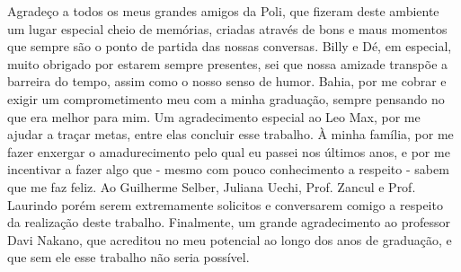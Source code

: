 \begin{agradecimentos}

Agradeço a todos os meus grandes amigos da Poli, que fizeram deste ambiente um lugar especial cheio de memórias, criadas através de bons e maus momentos que sempre são o ponto de partida das nossas conversas. Billy e Dé, em especial, muito obrigado por estarem sempre presentes, sei que nossa amizade transpõe a barreira do tempo, assim como o nosso senso de humor. Bahia, por me cobrar e exigir um comprometimento meu com a minha graduação, sempre pensando no que era melhor para mim. Um agradecimento especial ao Leo Max, por me ajudar a traçar metas, entre elas concluir esse trabalho. À minha família, por me fazer enxergar o amadurecimento pelo qual eu passei nos últimos anos, e por me incentivar a fazer algo que - mesmo com pouco conhecimento a respeito -  sabem que me faz feliz. Ao Guilherme Selber, Juliana Uechi, Prof. Zancul e Prof. Laurindo porém serem extremamente solicitos e conversarem comigo a respeito da realização deste trabalho. Finalmente, um grande agradecimento ao professor Davi Nakano, que acreditou no meu potencial ao longo dos anos de graduação, e que sem ele esse trabalho não seria possível.

\end{agradecimentos}